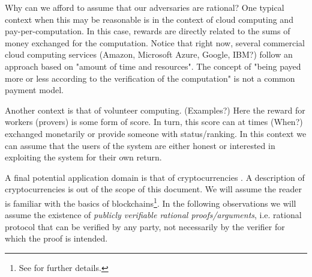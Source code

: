 Why can we afford to assume that our adversaries are rational? 
One typical context when this may be reasonable is in the context of cloud computing and pay-per-computation. 
In this case, rewards are directly related to the sums of money exchanged for the computation. 
Notice that right now, several commercial cloud computing services \XXX (Amazon, Microsoft Azure, Google, IBM?) follow
an approach based on "amount of time and resources". The concept of "being payed more or less according to the verification of the computation" is not a common payment model. \XXX

Another context is that of volunteer computing. \XXX (Examples?)
Here the reward for workers (provers) is some form of score. In turn, this score can at times (\XXX When?) exchanged
monetarily or provide someone with status/ranking. In this context we can assume that the users of the system are either honest or interested in exploiting the system for their own return.


A final potential application domain is that of cryptocurrencies \CN. A description of cryptocurrencies is out of the scope of this document. We will assume the reader is familiar with the basics of blockchains\footnote{See \CN for further details.}. In the following observations we will assume the existence of \textit{publicly verifiable rational proofs/arguments}, i.e. rational protocol that can be verified by any party, not necessarily by the verifier for which the proof is intended. 

